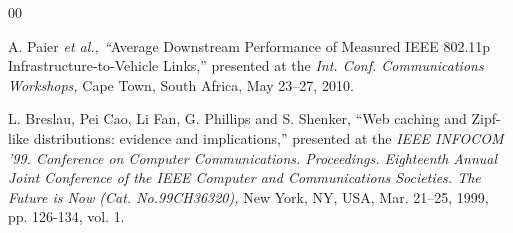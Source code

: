 \documentclass{ieeeaccess}
\begin{document}
\begin{thebibliography}{00}

A. Paier \emph{et al., ``}Average Downstream Performance of Measured IEEE 802.11p Infrastructure-to-Vehicle Links,'' presented at the \emph{Int. Conf. Communications Workshops,} Cape Town, South Africa, May 23--27, 2010.

L. Breslau, Pei Cao, Li Fan, G. Phillips and S. Shenker, ``Web caching and Zipf-like distributions: evidence and implications,'' presented at the \emph{IEEE INFOCOM '99. Conference on Computer Communications. Proceedings. Eighteenth Annual Joint Conference of the IEEE Computer and Communications Societies. The Future is Now (Cat. No.99CH36320),} New York, NY, USA, Mar. 21--25, 1999, pp. 126-134, vol. 1.


\end{thebibliography}
\end{document}
